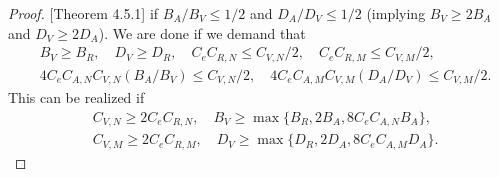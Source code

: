 \begin{proof}{[Theorem 4.5.1]}
if $B_A/B_V \leq 1/2$ and $D_A/D_V \leq 1/2$ (implying $B_V \geq 2B_A$ and $D_V \geq 2D_A$). We are done if we demand that
\begin{align*}
  &B_V \geq B_R, \quad D_V \geq D_R, \quad C_eC_{R,N}\leq C_{V,N}/2,\quad C_eC_{R,M}\leq C_{V,M}/2,\\&
  4C_eC_{A,N}C_{V,N}(B_A/B_V) \leq C_{V,N}/2,\quad 
  4C_eC_{A,M}C_{V,M}(D_A/D_V) \leq C_{V,M}/2.
\end{align*}
This can be realized if
\begin{align*}
&C_{V,N}\geq 2C_eC_{R,N}, \quad B_V \geq \operatorname{max}\{B_R,2B_A,8C_eC_{A,N}B_A\},\\&
C_{V,M}\geq 2C_eC_{R,M}, \quad D_V \geq \operatorname{max}\{D_R,2D_A,8C_eC_{A,M}D_A\}.
\end{align*}
\end{proof}

